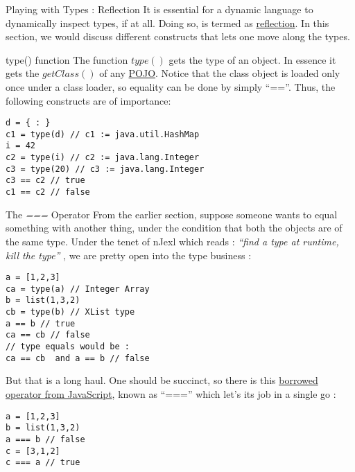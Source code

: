 \begin{section}{Playing with Types : Reflection}
It is essential for a dynamic language to dynamically 
inspect types, if at all. Doing so, is termed as 
\href{https://en.wikipedia.org/wiki/Reflection\_(computer\_programming)}{reflection}.
In this section, we would discuss different constructs that lets one move along the types.


\begin{subsection}{type() function} 
The function $type()$ gets the type of an object.
In essence it gets the $getClass()$ of any 
\href{https://en.wikipedia.org/wiki/Plain\_Old\_Java\_Object}{POJO}.
Notice that the class object is loaded only once under a class loader,
so equality can be done by simply ``==''.
Thus, the following constructs are of importance:

\begin{center}\begin{minipage}{\linewidth}
\begin{lstlisting}[style=JexlStyle]
d = { : }
c1 = type(d) // c1 := java.util.HashMap
i = 42
c2 = type(i) // c2 := java.lang.Integer
c3 = type(20) // c3 := java.lang.Integer
c3 == c2 // true 
c1 == c2 // false 
\end{lstlisting}
\end{minipage}\end{center}

\end{subsection}

\begin{subsection}{The \emph{===} Operator}
From the earlier section, suppose someone wants to 
equal something with another thing, under the condition
that both the objects are of the same type.
Under the tenet of nJexl which reads : \emph{ ``find a type at runtime, kill the type'' },
we are pretty open into the type business :

\begin{lstlisting}[style=JexlStyle]
a = [1,2,3] 
ca = type(a) // Integer Array 
b = list(1,3,2)
cb = type(b) // XList type 
a == b // true 
ca == cb // false 
// type equals would be :
ca == cb  and a == b // false  
\end{lstlisting}

But that is a long haul. One should be succinct,
so there is this \href{http://www.w3schools.com/js/js\_operators.asp}{borrowed operator from JavaScript},
known as ``==='' which let's its job in a single go :

\begin{lstlisting}[style=JexlStyle]
a = [1,2,3] 
b = list(1,3,2)
a === b // false 
c = [3,1,2]
c === a // true 
\end{lstlisting}
\end{subsection}


\end{section}
